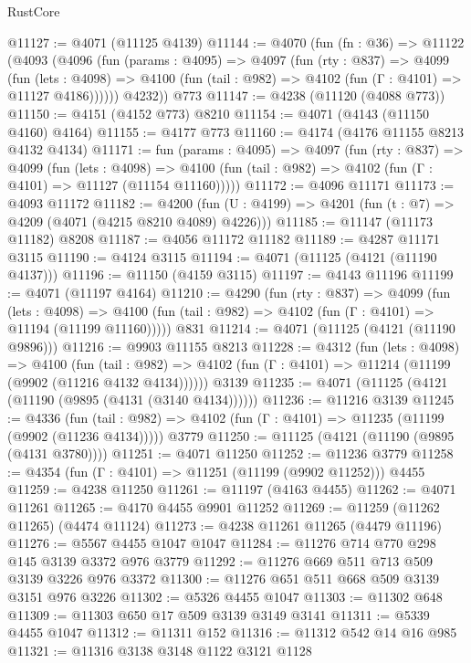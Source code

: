 \begin{lexlean}{RustCore}
\begin{coremodule}
@11127 := @4071 (@11125 @4139)
@11144 := @4070
    (fun (fn : @36) =>
    @11122
      (@4093
        (@4096
          (fun (params : @4095) =>
          @4097
            (fun (rty : @837) =>
            @4099
              (fun (lets : @4098) =>
              @4100 (fun (tail : @982) => @4102 (fun (Γ : @4101) => @11127 @4186))))))
        @4232))
    @773
@11147 := @4238 (@11120 (@4088 @773))
@11150 := @4151 (@4152 @773) @8210
@11154 := @4071 (@4143 (@11150 @4160) @4164)
@11155 := @4177 @773
@11160 := @4174 (@4176 @11155 @8213 @4132 @4134)
@11171 := fun (params : @4095) =>
  @4097
    (fun (rty : @837) =>
    @4099
      (fun (lets : @4098) =>
      @4100 (fun (tail : @982) => @4102 (fun (Γ : @4101) => @11127 (@11154 @11160)))))
@11172 := @4096 @11171
@11173 := @4093 @11172
@11182 := @4200 (fun (U : @4199) => @4201 (fun (t : @7) => @4209 (@4071 (@4215 @8210 @4089) @4226)))
@11185 := @11147 (@11173 @11182) @8208
@11187 := @4056 @11172 @11182
@11189 := @4287 @11171 @3115
@11190 := @4124 @3115
@11194 := @4071 (@11125 (@4121 (@11190 @4137)))
@11196 := @11150 (@4159 @3115)
@11197 := @4143 @11196
@11199 := @4071 (@11197 @4164)
@11210 := @4290
    (fun (rty : @837) =>
    @4099
      (fun (lets : @4098) =>
      @4100 (fun (tail : @982) => @4102 (fun (Γ : @4101) => @11194 (@11199 @11160)))))
    @831
@11214 := @4071 (@11125 (@4121 (@11190 @9896)))
@11216 := @9903 @11155 @8213
@11228 := @4312
    (fun (lets : @4098) =>
    @4100
      (fun (tail : @982) =>
      @4102 (fun (Γ : @4101) => @11214 (@11199 (@9902 (@11216 @4132 @4134))))))
    @3139
@11235 := @4071 (@11125 (@4121 (@11190 (@9895 (@4131 (@3140 @4134))))))
@11236 := @11216 @3139
@11245 := @4336
    (fun (tail : @982) => @4102 (fun (Γ : @4101) => @11235 (@11199 (@9902 (@11236 @4134)))))
    @3779
@11250 := @11125 (@4121 (@11190 (@9895 (@4131 @3780))))
@11251 := @4071 @11250
@11252 := @11236 @3779
@11258 := @4354 (fun (Γ : @4101) => @11251 (@11199 (@9902 @11252))) @4455
@11259 := @4238 @11250
@11261 := @11197 (@4163 @4455)
@11262 := @4071 @11261
@11265 := @4170 @4455 @9901 @11252
@11269 := @11259 (@11262 @11265) (@4474 @11124)
@11273 := @4238 @11261 @11265 (@4479 @11196)
@11276 := @5567 @4455 @1047 @1047
@11284 := @11276 @714 @770 @298 @145 @3139 @3372 @976 @3779
@11292 := @11276 @669 @511 @713 @509 @3139 @3226 @976 @3372
@11300 := @11276 @651 @511 @668 @509 @3139 @3151 @976 @3226
@11302 := @5326 @4455 @1047
@11303 := @11302 @648
@11309 := @11303 @650 @17 @509 @3139 @3149 @3141
@11311 := @5339 @4455 @1047
@11312 := @11311 @152
@11316 := @11312 @542 @14 @16 @985
@11321 := @11316 @3138 @3148 @1122 @3121 @1128

\end{coremodule}
\end{lexlean}
